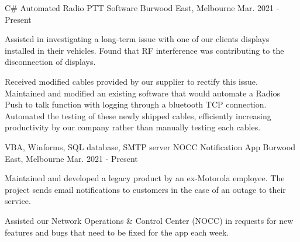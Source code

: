 \begin{cventries}
{\begin{cvitems}
      \end{cvitems}
    }
  \cventry
    {C\#}
    {Automated Radio PTT Software}
    {Burwood East, Melbourne}
    {Mar. 2021 - Present}
    {
      \begin{cvitems}
        \item {Assisted in investigating a long-term issue with one of our clients displays installed in their vehicles. Found that RF interference was contributing to the disconnection of displays.}
        \item {Received modified cables provided by our supplier to rectify this issue. Maintained and modified an existing software that would automate a Radios Push to talk function with logging through a bluetooth TCP connection. Automated the testing of these newly shipped cables, efficiently increasing productivity by our company rather than manually testing each cables.}
      \end{cvitems}
    }
  \cventry
    {VBA, Winforms, SQL database, SMTP server}
    {NOCC Notification App}
    {Burwood East, Melbourne}
    {Mar. 2021 - Present}
    {
      \begin{cvitems}
        \item {Maintained and developed a legacy product by an ex-Motorola employee. The project sends email notifications to customers in the case of an outage to their service.}
        \item {Assisted our Network Operations \& Control Center (NOCC) in requests for new features and bugs that need to be fixed for the app each week.}
      \end{cvitems}
    }
\end{cventries}
